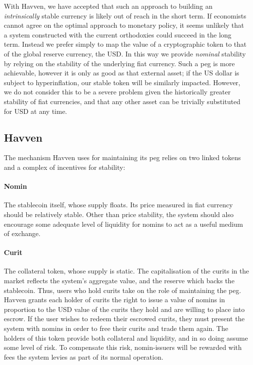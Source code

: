 \noindent With Havven, we have accepted that such an approach to building an \textit{intrinsically} stable
currency is likely out of reach in the short term.
If economists cannot agree on the optimal approach to monetary policy, it seems unlikely that a system
constructed with the current orthodoxies could succeed in the long term.
Instead we prefer simply to map the value of a cryptographic token to that of the global reserve currency, the USD.
In this way we provide \textit{nominal} stability by relying on the stability of the underlying
fiat currency.
Such a peg is more achievable, however it is only as good as that external asset; if the US dollar is subject to hyperinflation, our stable token will be similarly impacted.
However, we do not consider this to be a severe problem given the historically greater stability of
fiat currencies, and that any other asset can be trivially substituted for USD at any time. \\

\subsection{Havven}
\noindent The mechanism Havven uses for maintaining its peg relies on two linked tokens and a
complex of incentives for stability:

\paragraph{Nomin} The stablecoin itself, whose supply floats. Its price measured in fiat currency should be relatively stable.
Other than price stability, the system should also encourage some adequate level of liquidity for nomins
to act as a useful medium of exchange.

\paragraph{Curit} The collateral token, whose supply is static.
The capitalisation of the curits in the market reflects the system's aggregate value, and the reserve
which backs the stablecoin. Thus, users who hold curits take on the role of maintaining the peg. \\

\noindent Havven grants each holder of curits the right to issue a value of nomins in proportion to the USD value
of the curits they hold and are willing to place into escrow. If the user wishes to redeem their escrowed curits, they must
present the system with nomins in order to free their curits and trade them again.
The holders of this token provide both collateral and liquidity, and in so doing assume some
level of risk. To compensate this risk, nomin-issuers will be rewarded with fees the system levies
as part of its normal operation.

